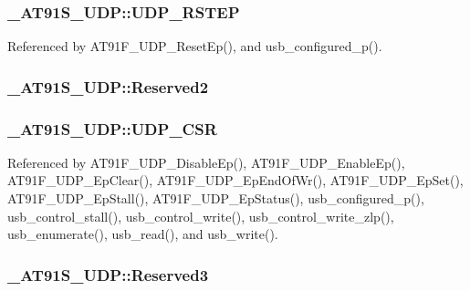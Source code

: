 \hypertarget{struct__AT91S__UDP_b171e6dc8a3bade2c3ba5359d74b7fea}{
\subsubsection{ {\bf \_\-AT91S\_\-UDP::UDP\_\-RSTEP}}}
\label{struct__AT91S__UDP_b171e6dc8a3bade2c3ba5359d74b7fea}




Referenced by AT91F\_\-UDP\_\-ResetEp(), and usb\_\-configured\_\-p().\hypertarget{struct__AT91S__UDP_0c441ba136413330a5de9dd5160d4d42}{
\subsubsection{ {\bf \_\-AT91S\_\-UDP::Reserved2}}}
\label{struct__AT91S__UDP_0c441ba136413330a5de9dd5160d4d42}


\hypertarget{struct__AT91S__UDP_b580e8f3463413dae9a97276d2967a15}{
\subsubsection{ {\bf \_\-AT91S\_\-UDP::UDP\_\-CSR}}}
\label{struct__AT91S__UDP_b580e8f3463413dae9a97276d2967a15}




Referenced by AT91F\_\-UDP\_\-DisableEp(), AT91F\_\-UDP\_\-EnableEp(), AT91F\_\-UDP\_\-EpClear(), AT91F\_\-UDP\_\-EpEndOfWr(), AT91F\_\-UDP\_\-EpSet(), AT91F\_\-UDP\_\-EpStall(), AT91F\_\-UDP\_\-EpStatus(), usb\_\-configured\_\-p(), usb\_\-control\_\-stall(), usb\_\-control\_\-write(), usb\_\-control\_\-write\_\-zlp(), usb\_\-enumerate(), usb\_\-read(), and usb\_\-write().\hypertarget{struct__AT91S__UDP_5510369d42dacd07d35b4bf302e701fc}{
\subsubsection{ {\bf \_\-AT91S\_\-UDP::Reserved3}}}
\label{struct__AT91S__UDP_5510369d42dacd07d35b4bf302e701fc}


